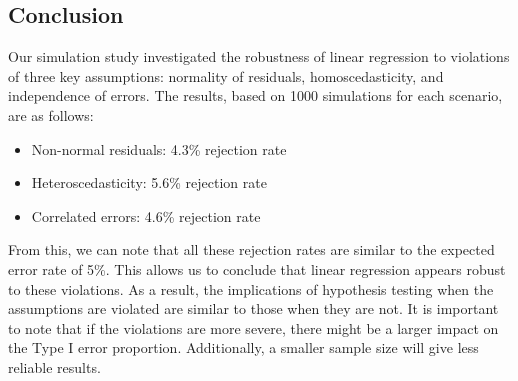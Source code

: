 \documentclass{article}
\begin{document}
\subsection{Conclusion}
Our simulation study investigated the robustness of linear regression to violations of three key assumptions: normality of residuals, homoscedasticity, and independence of errors. The results, based on 1000 simulations for each scenario, are as follows:
\begin{itemize}
    \item Non-normal residuals: 4.3\% rejection rate
    \item Heteroscedasticity: 5.6\% rejection rate
    \item Correlated errors: 4.6\% rejection rate
\end{itemize}
From this, we can note that all these rejection rates are similar to the expected error rate of 5\%. This allows us to conclude that linear regression appears robust to these violations. As a result, the implications of hypothesis testing when the assumptions are violated are similar to those when they are not. It is important to note that if the violations are more severe, there might be a larger impact on the Type I error proportion. Additionally, a smaller sample size will give less reliable results.
\end{document}
